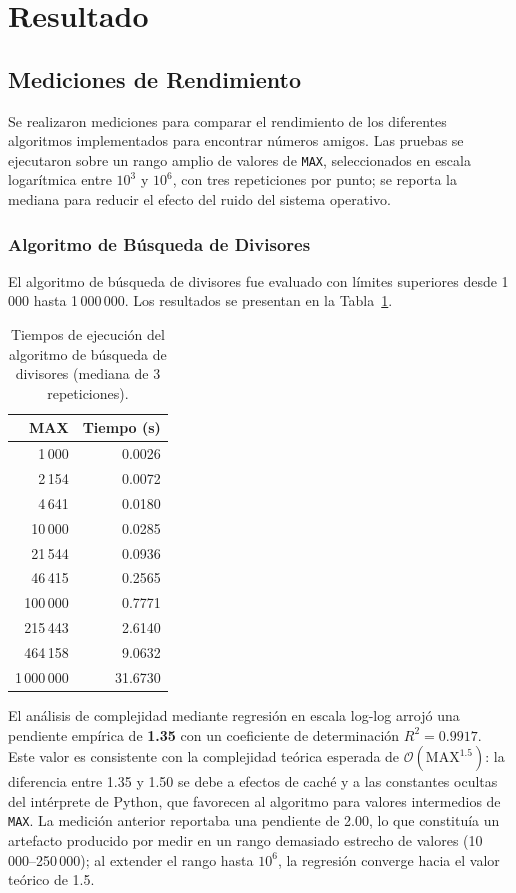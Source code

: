 \section{Resultado}

\subsection{Mediciones de Rendimiento}

Se realizaron mediciones para comparar el rendimiento de los diferentes algoritmos
implementados para encontrar números amigos. Las pruebas se ejecutaron sobre un rango
amplio de valores de \texttt{MAX}, seleccionados en escala logarítmica entre
$10^{3}$ y $10^{6}$, con tres repeticiones por punto; se reporta la mediana para
reducir el efecto del ruido del sistema operativo.

\subsubsection{Algoritmo de Búsqueda de Divisores}

El algoritmo de búsqueda de divisores fue evaluado con límites superiores desde
1\,000 hasta 1\,000\,000. Los resultados se presentan en la
Tabla~\ref{tab:busqueda_divisores}.

\begin{table}[htbp]
\centering
\begin{tabular}{|r|r|}
\hline
\textbf{MAX} & \textbf{Tiempo (s)} \\
\hline
1\,000     &  0.0026 \\
2\,154     &  0.0072 \\
4\,641     &  0.0180 \\
10\,000    &  0.0285 \\
21\,544    &  0.0936 \\
46\,415    &  0.2565 \\
100\,000   &  0.7771 \\
215\,443   &  2.6140 \\
464\,158   &  9.0632 \\
1\,000\,000 & 31.6730 \\
\hline
\end{tabular}
\caption{Tiempos de ejecución del algoritmo de búsqueda de divisores
         (mediana de 3 repeticiones).}
\label{tab:busqueda_divisores}
\end{table}

El análisis de complejidad mediante regresión en escala log-log arrojó una pendiente
empírica de \textbf{1.35} con un coeficiente de determinación $R^{2} = 0.9917$.
Este valor es consistente con la complejidad teórica esperada de
$\mathcal{O}(\text{MAX}^{1.5})$: la diferencia entre 1.35 y 1.50 se debe a
efectos de caché y a las constantes ocultas del intérprete de Python, que
favorecen al algoritmo para valores intermedios de \texttt{MAX}.
La medición anterior reportaba una pendiente de 2.00, lo que constituía un
artefacto producido por medir en un rango demasiado estrecho de valores
(10\,000--250\,000); al extender el rango hasta $10^{6}$, la regresión converge
hacia el valor teórico de 1.5.

